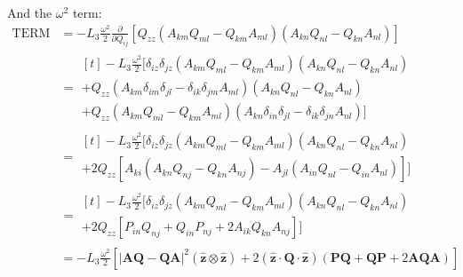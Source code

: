 \documentclass[reqno]{article}
\newcommand{\Q}{\mathbf{Q}}
\newcommand{\bP}{\mathbf{P}}
\newcommand{\A}{\mathbf{A}}
\newcommand{\z}{\mathbf{\hat{z}}}
\begin{document}
And the $\omega^2$ term:
\begin{equation}
\begin{split}
    \text{TERM}
    &=
    -L_3 \frac{\omega^2}{2} \frac{\partial}{\partial Q_{ij}} \left[
        Q_{zz} 
        \left( A_{km} Q_{ml} - Q_{km} A_{ml} \right)
        \left( A_{kn} Q_{nl} - Q_{kn} A_{nl} \right)
    \right] \\
    &=
    \begin{multlined}[t]
    -L_3 \frac{\omega^2}{2} \bigl[
        \delta_{iz} \delta_{jz}
        \left( A_{km} Q_{ml} - Q_{km} A_{ml} \right)
        \left( A_{kn} Q_{nl} - Q_{kn} A_{nl} \right) \\
        +
        Q_{zz} \left(
            A_{km} \delta_{im} \delta_{jl}
            - \delta_{ik} \delta_{jm} A_{ml}
        \right)
        \left( A_{kn} Q_{nl} - Q_{kn} A_{nl} \right) \\
        +
        Q_{zz} 
        \left( A_{km} Q_{ml} - Q_{km} A_{ml} \right)
        \left(
            A_{kn} \delta_{in} \delta_{jl}
            - \delta_{ik} \delta_{jn} A_{nl}
        \right)
    \bigr]
    \end{multlined} \\
    &=
    \begin{multlined}[t]
    -L_3 \frac{\omega^2}{2} \biggl[
        \delta_{iz} \delta_{jz}
        \left( A_{km} Q_{ml} - Q_{km} A_{ml} \right)
        \left( A_{kn} Q_{nl} - Q_{kn} A_{nl} \right) \\
        +
        2 Q_{zz} \left[
            A_{ki} \left( A_{kn} Q_{nj} - Q_{kn} A_{nj} \right)
            - A_{jl}\left( A_{in} Q_{nl} - Q_{in} A_{nl} \right)
        \right] 
    \biggr]
    \end{multlined} \\
    &=
    \begin{multlined}[t]
    -L_3 \frac{\omega^2}{2} \biggl[
        \delta_{iz} \delta_{jz}
        \left( A_{km} Q_{ml} - Q_{km} A_{ml} \right)
        \left( A_{kn} Q_{nl} - Q_{kn} A_{nl} \right) \\
        +
        2 Q_{zz} \left[
            P_{in} Q_{nj} + Q_{in} P_{nj} + 2 A_{ik}Q_{kn} A_{nj}
        \right] 
    \biggr]
    \end{multlined} \\
    &=
    -L_3 \frac{\omega^2}{2} \left[
        \left| \A \Q - \Q \A \right|^2 \left( \z \otimes \z \right)
        +
        2 \left( \z \cdot \Q \cdot \z \right) \left(
            \bP \Q + \Q \bP + 2 \A \Q \A
        \right)
    \right]
\end{split}
\end{equation}
\end{document}
